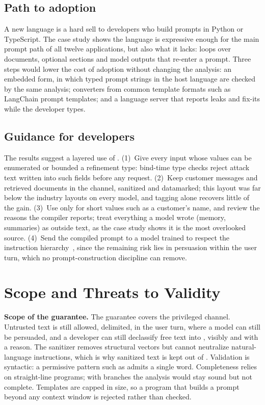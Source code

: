 \documentclass[journal]{IEEEtran}
\begin{document}
\subsection{Path to adoption}
A new language is a hard sell to developers who build prompts in Python or TypeScript. The case study shows the language is expressive enough for the main prompt path of all twelve applications, but also what it lacks: loops over documents, optional sections and model outputs that re-enter a prompt. Three steps would lower the cost of adoption without changing the analysis: an embedded form, in which typed prompt strings in the host language are checked by the same analysis; converters from common template formats such as LangChain prompt templates; and a language server that reports leaks and fix-its while the developer types.

\subsection{Guidance for developers}
The results suggest a layered use of \TL{}. (1)~Give every input whose values can be enumerated or bounded a refinement type: bind-time type checks reject attack text written into such fields before any request. (2)~Keep customer messages and retrieved documents in the  channel, sanitized and datamarked; this layout was far below the industry layouts on every model, and tagging alone recovers little of the gain. (3)~Use  only for short values such as a customer's name, and review the reasons the compiler reports; treat everything a model wrote (memory, summaries) as outside text, as the case study shows it is the most overlooked source. (4)~Send the compiled prompt to a model trained to respect the instruction hierarchy~\cite{wallace2024hierarchy}, since the remaining risk lies in persuasion within the user turn, which no prompt-construction discipline can remove.

\section{Scope and Threats to Validity}\label{sec:limits}

\textbf{Scope of the guarantee.} The guarantee covers the privileged channel. Untrusted text is still allowed, delimited, in the user turn, where a model can still be persuaded, and a developer can still declassify free text into , visibly and with a reason. The sanitizer removes structural vectors but cannot neutralize natural-language instructions, which is why sanitized text is kept out of . Validation is syntactic: a permissive pattern such as  admits a single word. Completeness relies on straight-line programs; with branches the analysis would stay sound but not complete. Templates are capped in size, so a program that builds a prompt beyond any context window is rejected rather than checked.
\end{document}

